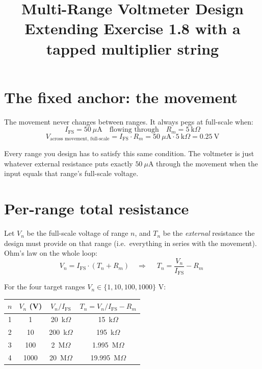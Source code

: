 \documentclass[11pt,a4paper]{article}
\title{\vspace{-2em}\textbf{Multi-Range Voltmeter Design}\\
       \large Extending Exercise 1.8 with a tapped multiplier string}
\author{}
\date{}
\begin{document}
\maketitle
\vspace{-3em}

\section*{The fixed anchor: the movement}

The movement never changes between ranges. It always pegs at full-scale when:
\[
I_{\text{FS}} = 50\ \mu\text{A} \quad\text{flowing through}\quad R_m = 5\ \text{k}\Omega
\]
\[
V_{\text{across movement, full-scale}} = I_{\text{FS}} \cdot R_m = 50\ \mu\text{A} \cdot 5\ \text{k}\Omega = 0.25\ \text{V}
\]

Every range you design has to satisfy this same condition. The voltmeter is just whatever external resistance puts exactly $50\ \mu\text{A}$ through the movement when the input equals that range's full-scale voltage.

\section*{Per-range total resistance}

Let $V_n$ be the full-scale voltage of range $n$, and $T_n$ be the \emph{external} resistance the design must provide on that range (i.e.\ everything in series with the movement). Ohm's law on the whole loop:
\[
V_n = I_{\text{FS}} \cdot (T_n + R_m)
\quad\Longrightarrow\quad
\boxed{\;T_n = \dfrac{V_n}{I_{\text{FS}}} - R_m\;}
\]

For the four target ranges $V_n \in \{1, 10, 100, 1000\}$ V:

\begin{center}
\begin{tabular}{cccc}
\toprule
$n$ & $V_n$ (V) & $V_n / I_{\text{FS}}$ & $T_n = V_n/I_{\text{FS}} - R_m$ \\
\midrule
1 & 1     & 20\ k$\Omega$    & 15\ k$\Omega$    \\
2 & 10    & 200\ k$\Omega$   & 195\ k$\Omega$   \\
3 & 100   & 2\ M$\Omega$     & 1.995\ M$\Omega$ \\
4 & 1000  & 20\ M$\Omega$    & 19.995\ M$\Omega$ \\
\bottomrule
\end{tabular}
\end{center}
\end{document}
